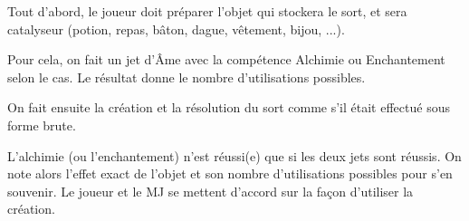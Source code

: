 Tout d'abord, le joueur doit préparer l'objet qui stockera le sort, et sera catalyseur (potion, repas, bâton, dague, vêtement, bijou, ...).

Pour cela, on fait un jet d'Âme avec la compétence Alchimie ou Enchantement selon le cas. Le résultat donne le nombre d'utilisations possibles.

On fait ensuite la création et la résolution du sort comme s'il était effectué sous forme brute.

L'alchimie (ou l'enchantement) n'est réussi(e) que si les deux jets sont réussis. On note alors l'effet exact de l'objet et son nombre d'utilisations possibles pour s'en souvenir. Le joueur et le MJ se mettent d'accord sur la façon d'utiliser la création.

